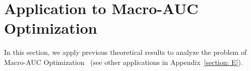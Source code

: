 \documentclass{article}
\def\eE{\mathbb{E}}
\def\pP{\mathbb{P}}
\newtheorem*{remark}{Remark}
\begin{document}






\section{Application to Macro-AUC Optimization}  
\label{section: applications}
In this section, we apply previous theoretical results to analyze the problem of Macro-AUC Optimization~\cite{21macro3,wu2023macro-auc,macro24,zhang2024generalization} (see other applications in Appendix~\ref{section: E}). 
\end{document}
